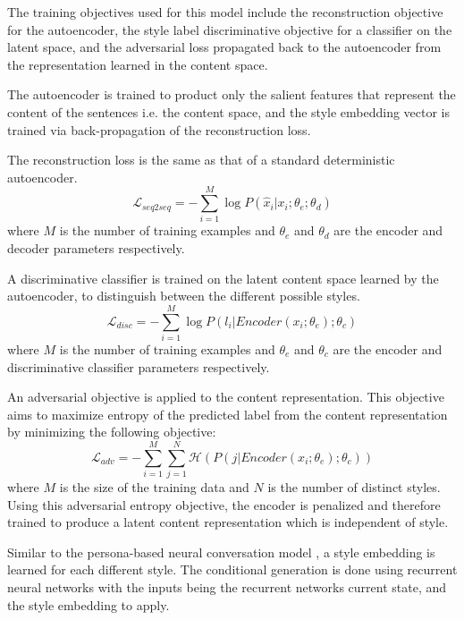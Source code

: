 The training objectives used for this model include the reconstruction objective for the autoencoder, the style label discriminative objective for a classifier on the latent space, and the adversarial loss propagated back to the autoencoder from the representation learned in the content space.

The autoencoder is trained to product only the salient features that represent the content of the sentences i.e. the content space, and the style embedding vector is trained via back-propagation of the reconstruction loss.

The reconstruction loss is the same as that of a standard deterministic autoencoder.
\begin{equation}
	\mathcal{L}_{seq2seq} = -\sum_{i=1}^M \log P(\hat{x}_i|x_i;\theta_e;\theta_d)
\end{equation}
where $M$ is the number of training examples and $\theta_e$ and $\theta_d$ are the encoder and decoder parameters respectively.

A discriminative classifier is trained on the latent content space learned by the autoencoder, to distinguish between the different possible styles.
\begin{equation}
	\mathcal{L}_{disc} = -\sum_{i=1}^M \log P(l_i|Encoder(x_i;\theta_e);\theta_c)
\end{equation}
where $M$ is the number of training examples and $\theta_e$ and $\theta_c$ are the encoder and discriminative classifier parameters respectively.

An adversarial objective is applied to the content representation. This objective aims to maximize entropy of the predicted label from the content representation by minimizing the following objective:
\begin{equation}
	\mathcal{L}_{adv} = -\sum_{i=1}^M\sum_{j=1}^N \mathcal{H}(P(j|Encoder(x_i; \theta_e); \theta_c))
\end{equation}
where $M$ is the size of the training data and $N$ is the number of distinct styles. Using this adversarial entropy objective, the encoder is penalized and therefore trained to produce a latent content representation which is independent of style.

Similar to the persona-based neural conversation model \citep{li2016persona}, a style embedding is learned for each different style. The conditional generation is done using recurrent neural networks with the inputs being the recurrent networks current state, and the style embedding to apply.


